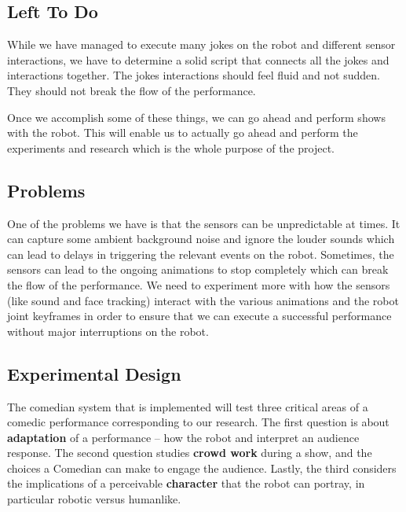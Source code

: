 \documentclass[onecolumn, draftclsnofoot,10pt, compsoc]{IEEEtran}
\begin{document}
\subsection{Left To Do}

While we have managed to execute many jokes on the robot and different sensor interactions, we have to determine a solid script that connects all the jokes and interactions together. The jokes interactions should feel fluid and not sudden. They should not break the flow of the performance.

Once we accomplish some of these things, we can go ahead and perform shows with the robot. This will enable us to actually go ahead and perform the experiments and research which is the whole purpose of the project.

\subsection{Problems}

One of the problems we have is that the sensors can be unpredictable at times. It can capture some ambient background noise and ignore the louder sounds which can lead to delays in triggering the relevant events on the robot. Sometimes, the sensors can lead to the ongoing animations to stop completely which can break the flow of the performance. We need to experiment more with how the sensors (like sound and face tracking) interact with the various animations and the robot joint keyframes in order to ensure that we can execute a successful performance without major interruptions on the robot.

\subsection{Experimental Design}

The comedian system that is implemented will test three critical areas of a comedic performance corresponding to our research. The first question is about \textbf{adaptation} of a performance -- how the robot and interpret an audience response. The second question studies \textbf{crowd work} during a show, and the choices a Comedian can make to engage the audience. Lastly, the third considers the implications of a perceivable \textbf{character} that the robot can portray, in particular robotic versus humanlike.

\end{document}
